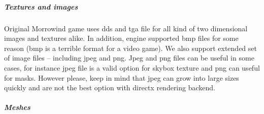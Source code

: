 \subparagraph{Textures and images}
Original Morrowind game uses dds and tga file for all kind of two dimensional images and textures alike. In addition, engine supported bmp files for some reason (bmp is a terrible format for a video game). We also support extended set of image files -- including jpeg and png. Jpeg and png files can be useful in some cases, for instance jpeg file is a valid option for skybox texture and png can useful for masks. However please, keep in mind that jpeg can grow into large sizes quickly and are not the best option with directx rendering backend.

\subparagraph{Meshes} %